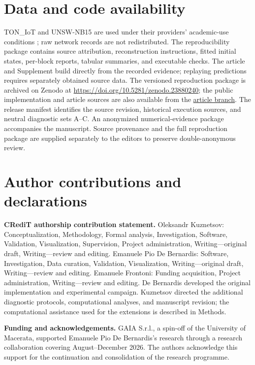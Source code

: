 \section*{Data and code availability}
TON\_IoT and UNSW-NB15 are used under their providers' academic-use conditions \citep{toniotweb,unswweb}; raw network records are not redistributed. The reproducibility package contains source attribution, reconstruction instructions, fitted initial states, per-block reports, tabular summaries, and executable checks. The article and Supplement build directly from the recorded evidence; replaying predictions requires separately obtained source data.
\ifdefined\AuthorVersion
The versioned reproduction package is archived on Zenodo at \url{https://doi.org/10.5281/zenodo.23880240}; the public implementation and article sources are also available from the \href{https://github.com/KuznetsovKarazin/kan-ids-v2/tree/paper2/dtrap-submission-20261102}{article branch}. The release manifest identifies the source revision, historical execution sources, and neutral diagnostic sets A--C.
\else
An anonymized numerical-evidence package accompanies the manuscript. Source provenance and the full reproduction package are supplied separately to the editors to preserve double-anonymous review.
\fi

\ifdefined\AuthorVersion
\section*{Author contributions and declarations}
\noindent\textbf{CRediT authorship contribution statement.} Oleksandr Kuznetsov: Conceptualization, Methodology, Formal analysis, Investigation, Software, Validation, Visualization, Supervision, Project administration, Writing---original draft, Writing---review and editing. Emanuele Pio De Bernardis: Software, Investigation, Data curation, Validation, Visualization, Writing---original draft, Writing---review and editing. Emanuele Frontoni: Funding acquisition, Project administration, Writing---review and editing. De Bernardis developed the original implementation and experimental campaign. Kuznetsov directed the additional diagnostic protocols, computational analyses, and manuscript revision; the computational assistance used for the extensions is described in Methods.

\noindent\textbf{Funding and acknowledgements.} GAIA S.r.l., a spin-off of the University of Macerata, supported Emanuele Pio De Bernardis's research through a research collaboration covering August--December 2026. The authors acknowledge this support for the continuation and consolidation of the research programme.

